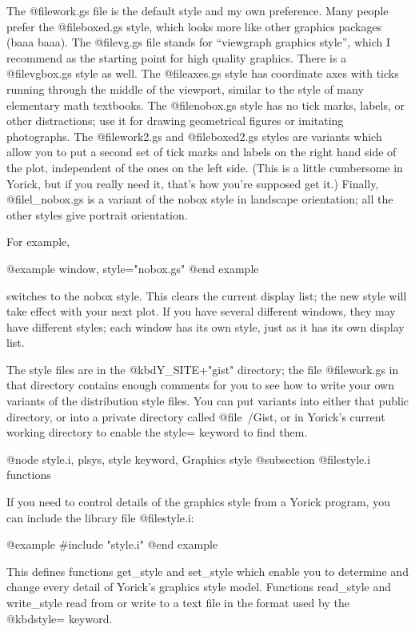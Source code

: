 The @file{work.gs} file is the default style and my own preference.
Many people prefer the @file{boxed.gs} style, which looks more like
other graphics packages (baaa baaa).  The @file{vg.gs} file stands for
``viewgraph graphics style'', which I recommend as the starting point
for high quality graphics.  There is a @file{vgbox.gs} style as well.
The @file{axes.gs} style has coordinate axes with ticks running through
the middle of the viewport, similar to the style of many elementary math
textbooks.  The @file{nobox.gs} style has no tick marks, labels, or
other distractions; use it for drawing geometrical figures or imitating
photographs.  The @file{work2.gs} and @file{boxed2.gs} styles are
variants which allow you to put a second set of tick marks and labels on
the right hand side of the plot, independent of the ones on the left
side.  (This is a little cumbersome in Yorick, but if you really need
it, that's how you're supposed get it.)  Finally, @file{l_nobox.gs} is a
variant of the nobox style in landscape orientation; all the other
styles give portrait orientation.

For example,

@example
window, style="nobox.gs"
@end example


switches to the nobox style.  This clears the current display list;
the new style will take effect with your next plot.  If you have
several different windows, they may have different styles; each window
has its own style, just as it has its own display list.

The style files are in the @kbd{Y_SITE+"gist"} directory; the file
@file{work.gs} in that directory contains enough comments for you to see
how to write your own variants of the distribution style files.  You can
put variants into either that public directory, or into a private
directory called @file{~/Gist}, or in Yorick's current working directory
to enable the style= keyword to find them.

@node style.i, plsys, style keyword, Graphics style
@subsection @file{style.i} functions

If you need to control details of the graphics style from a Yorick
program, you can include the library file @file{style.i}:

@example
#include "style.i"
@end example

This defines functions get_style and set_style which enable you to
determine and change every detail of Yorick's graphics style model.
Functions read_style and write_style read from or write to a text file
in the format used by the @kbd{style=} keyword.

